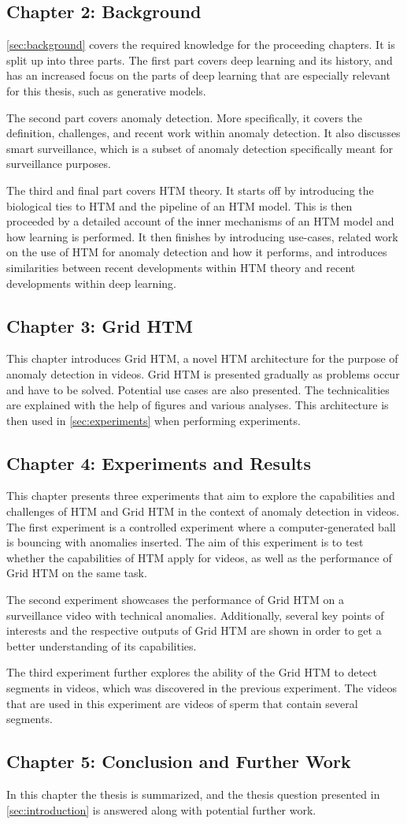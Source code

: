 \subsection*{Chapter 2: Background}
\autoref{sec:background} covers the required knowledge for the proceeding chapters. It is split up into three parts. The first part covers deep learning and its history, and has an increased focus on the parts of deep learning that are especially relevant for this thesis, such as generative models.
\par
The second part covers anomaly detection. More specifically, it covers the definition, challenges, and recent work within anomaly detection. It also discusses smart surveillance, which is a subset of anomaly detection specifically meant for surveillance purposes.
\par
The third and final part covers HTM theory. It starts off by introducing the biological ties to HTM and the pipeline of an HTM model. This is then proceeded by a detailed account of the inner mechanisms of an HTM model and how learning is performed. It then finishes by introducing use-cases, related work on the use of HTM for anomaly detection and how it performs, and introduces similarities between recent developments within HTM theory and recent developments within deep learning.
\subsection*{Chapter 3: Grid HTM}
This chapter introduces Grid HTM, a novel HTM architecture for the purpose of anomaly detection in videos. Grid HTM is presented gradually as problems occur and have to be solved. Potential use cases are also presented. The technicalities are explained with the help of figures and various analyses. This architecture is then used in \autoref{sec:experiments} when performing experiments.
\subsection*{Chapter 4: Experiments and Results}
This chapter presents three experiments that aim to explore the capabilities and challenges of HTM and Grid HTM in the context of anomaly detection in videos. The first experiment is a controlled experiment where a computer-generated ball is bouncing with anomalies inserted. The aim of this experiment is to test whether the capabilities of HTM apply for videos, as well as the performance of Grid HTM on the same task.
\par
The second experiment showcases the performance of Grid HTM on a surveillance video with technical anomalies. Additionally, several key points of interests and the respective outputs of Grid HTM are shown in order to get a better understanding of its capabilities.
\par
The third experiment further explores the ability of the Grid HTM to detect segments in videos, which was discovered in the previous experiment. The videos that are used in this experiment are videos of sperm that contain several segments.
\subsection*{Chapter 5: Conclusion and Further Work}
In this chapter the thesis is summarized, and the thesis question presented in \autoref{sec:introduction} is answered along with potential further work.